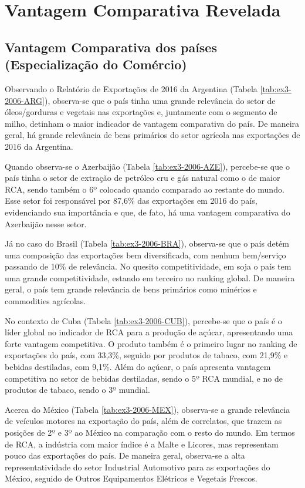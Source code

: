 \setcounter{section}{2}
\section{Vantagem Comparativa Revelada}
\setcounter{subsection}{3}

\subsection{Vantagem Comparativa dos países (Especialização do Comércio)}

Observando o Relatório de Exportações de 2016 da Argentina (Tabela \ref{tab:ex3-2006-ARG}), observa-se que o país tinha uma grande relevância do setor de óleos/gorduras e vegetais nas exportações e, juntamente com o segmento de milho, detinham o  maior indicador de vantagem comparativa do país. De maneira geral, há grande relevância de bens primários do setor agrícola nas exportações de 2016 da Argentina.

Quando observa-se o Azerbaijão (Tabela \ref{tab:ex3-2006-AZE}), percebe-se que o país tinha o setor de extração de petróleo cru e gás natural como o de maior RCA, sendo também o 6º colocado quando comparado ao restante do mundo. Esse setor foi responsável por 87,6\% das exportações em 2016 do país, evidenciando sua importância e que, de fato, há uma vantagem comparativa do Azerbaijão nesse setor. 

Já no caso do Brasil (Tabela \ref{tab:ex3-2006-BRA}), observa-se que o país detém uma composição das exportações bem diversificada, com nenhum bem/serviço passando de 10\% de relevância. No quesito competitividade, em soja o país tem uma grande competitividade, estando em terceiro no ranking global. De maneira geral, o país tem grande relevância de bens primários como minérios e commodities agrícolas.

No contexto de Cuba (Tabela \ref{tab:ex3-2006-CUB}), percebe-se que o país é o líder global no indicador de RCA para a produção de açúcar, apresentando uma forte vantagem competitiva. O produto também é o primeiro lugar no ranking de exportações do país, com 33,3\%, seguido por produtos de tabaco, com 21,9\% e bebidas destiladas, com 9,1\%. Além do açúcar, o país apresenta vantagem competitiva no setor de bebidas destiladas, sendo o 5º RCA mundial, e no de produtos de tabaco, sendo o 3º mundial.

Acerca do México (Tabela \ref{tab:ex3-2006-MEX}), observa-se a grande relevância de veículos motores na exportação do país, além de correlatos, que trazem as posições de 2º e 3º ao México na comparação com o resto do mundo. Em termos de RCA, a indústria com maior índice é a Malte e Licores, mas representam pouco das exportações do país. De maneira geral, observa-se a alta representatividade do setor Industrial Automotivo para as exportações do México, seguido de Outros Equipamentos Elétricos e Vegetais Frescos.


